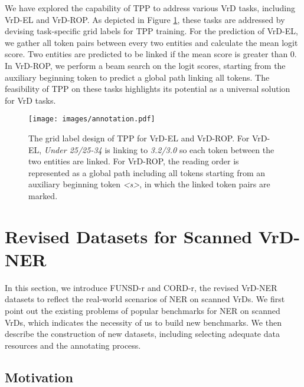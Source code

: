 \documentclass[11pt]{article}
\begin{document}
We have explored the capability of TPP to address various VrD tasks, including VrD-EL and VrD-ROP. 
As depicted in Figure \ref{fig:annotation}, these tasks are addressed by devising task-specific grid labels for TPP training. 
For the prediction of VrD-EL, we gather all token pairs between every two entities and calculate the mean logit score. Two entities are predicted to be linked if the mean score is greater than 0. 
In VrD-ROP, we perform a beam search on the logit scores, starting from the auxiliary beginning token to predict a global path linking all tokens. 
The feasibility of TPP on these tasks highlights its potential as a universal solution for VrD tasks.

\begin{figure}[t]
    \centering
\texttt{[image: images/annotation.pdf]}        
    \caption{
        The grid label design of TPP for VrD-EL and VrD-ROP. For VrD-EL, {\footnotesize \textit{Under 25/25-34}} is linking to {\footnotesize \textit{3.2/3.0}} so each token between the two entities are linked. For VrD-ROP, the reading order is represented as a global path including all tokens starting from an auxiliary beginning token \textit{<s>}, in which the linked token pairs are marked. }
\label{fig:annotation}
\end{figure}

\section{Revised Datasets for Scanned VrD-NER}

In this section, we introduce FUNSD-r and CORD-r, the revised VrD-NER datasets to reflect the real-world scenarios of NER on scanned VrDs. 
We first point out the existing problems of popular benchmarks for NER on scanned VrDs, which indicates the necessity of us to build new benchmarks. 
We then describe the construction of new datasets, including selecting adequate data resources and the annotating process.  


\subsection{Motivation}
\end{document}
